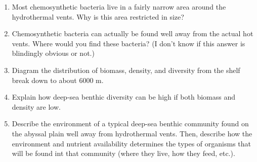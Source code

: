 \documentclass[nofonts, letterpaper]{tufte-handout}
\begin{document}
\begin{enumerate}
\item
  Most chemosynthetic bacteria live in a fairly narrow area around the
  hydrothermal vents. Why is this area restricted in size?

\item
  Chemosynthetic bacteria can actually be found well away from the
  actual hot vents. Where would you find these bacteria? (I don't know
  if this answer is blindingly obvious or not.)

\item
  Diagram the distribution of biomass, density, and diversity from the 
  shelf break down to about 6000 m.
 
\item
  Explain how deep-sea benthic diversity can be high if both biomass and 
  density are low.

\item
  Describe the environment of a typical deep-sea benthic community 
  found on the abyssal plain well away from hydrothermal vents. Then,
  describe how the environment and nutrient availability determines the types
  of organisms that will be found int that community (where they live, how they feed, etc.).

\end{enumerate}
\end{document}
